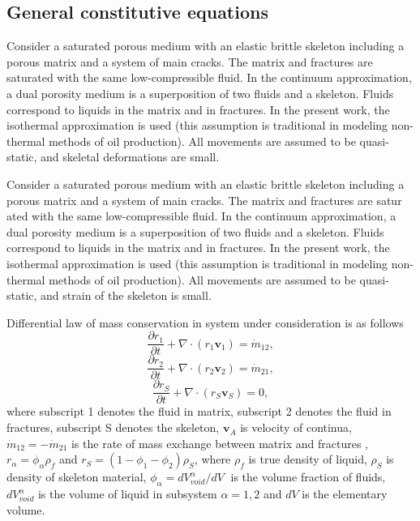 \documentclass[article,authoryear,jpm]{beg_39}             %
\begin{document}
\subsection{General constitutive equations}
\label{sec:2}
Consider a saturated porous medium with an elastic brittle skeleton including a porous matrix and a system of main cracks.
The matrix and fractures are saturated with the same low-compressible fluid.
In the continuum approximation, a dual porosity medium is a superposition of two fluids and a skeleton.
Fluids correspond to liquids in the matrix and in fractures.
In the present work, the isothermal approximation is used (this assumption is traditional in modeling non-thermal methods of oil production).
All movements are assumed to be quasi-static, and skeletal deformations are small.

Consider a saturated porous medium with an elastic brittle skeleton including a porous matrix and a system of main cracks.
The matrix and fractures are satur ated with the same low-compressible fluid.
In the continuum approximation, a dual porosity medium is a superposition of two fluids and a skeleton.
Fluids correspond to liquids in the matrix and in fractures.
In the present work, the isothermal approximation is used (this assumption is traditional in modeling non-thermal methods of oil production).
All movements are assumed to be quasi-static, and strain of the skeleton is small.

Differential law of mass conservation in system under consideration is as follows
\begin{equation}
\frac{\partial {{r}_{1}}}{\partial t}+\nabla \cdot \left( {{r}_{1}}{{\mathbf{v}}_{1}} \right)={{\dot{m}}_{12}},
\end{equation}
\begin{equation}
\frac{\partial {{r}_{2}}}{\partial t}+\nabla \cdot \left( {{r}_{2}}{{\mathbf{v}}_{2}} \right)={{\dot{m}}_{21}},
\end{equation}
\begin{equation}
\frac{\partial {{r}_{S}}}{\partial t}+\nabla \cdot \left( {{r}_{S}}{{\mathbf{v}}_{S}} \right)=0,
\end{equation}
where subscript 1 denotes the fluid in matrix, subscript 2 denotes the fluid in fractures, subscript S denotes the skeleton, ${{\mathbf{v}}_{A}}$ is velocity of continua, ${{\dot{m}}_{12}}=-{{\dot{m}}_{21}}$ is the rate of mass exchange between matrix and fractures , ${{r}_{\alpha }}={{\phi }_{\alpha }}{{\rho }_{f}}$ and ${{r}_{S}}=(1-{{\phi }_{1}}-{{\phi }_{2}}){{\rho }_{S}}$, where ${{\rho }_{f}}$ is true density of liquid, ${{\rho }_{S}}$ is density of skeleton material, ${{\phi }_{\alpha }}={dV_{void}^{\alpha }}/{dV}\;$ is the volume fraction of fluids, $dV_{void}^{\alpha }$ is the volume of liquid in subsystem $\alpha=1,2$ and $dV$ is the elementary volume.
\end{document}
